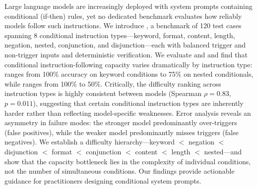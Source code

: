 Large language models are increasingly deployed with system prompts containing conditional (if-then) rules, yet no dedicated benchmark evaluates how reliably models follow such instructions. We introduce \benchname, a benchmark of 120 test cases spanning 8 conditional instruction types---keyword, format, content, length, negation, nested, conjunction, and disjunction---each with balanced trigger and non-trigger inputs and deterministic verification. We evaluate \gptlarge and \gptsmall and find that conditional instruction-following capacity varies dramatically by instruction type: \gptlarge ranges from 100\% accuracy on keyword conditions to 75\% on nested conditionals, while \gptsmall ranges from 100\% to 50\%. Critically, the difficulty ranking across instruction types is highly consistent between models (Spearman $\rho = 0.83$, $p = 0.011$), suggesting that certain conditional instruction types are inherently harder rather than reflecting model-specific weaknesses. Error analysis reveals an asymmetry in failure modes: the stronger model predominantly over-triggers (false positives), while the weaker model predominantly misses triggers (false negatives). We establish a difficulty hierarchy---keyword $<$ negation $<$ disjunction $<$ format $<$ conjunction $<$ content $<$ length $<$ nested---and show that the capacity bottleneck lies in the complexity of individual conditions, not the number of simultaneous conditions. Our findings provide actionable guidance for practitioners designing conditional system prompts.
